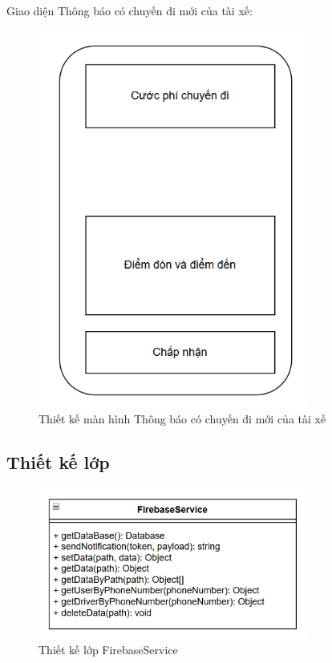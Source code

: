 \documentclass[../DoAn.tex]{subfiles}
\begin{document}
Giao diện Thông báo có chuyến đi mới của tài xế:
\begin{figure}[H]
    \centering
    \includegraphics[width=0.8\textwidth]{Hinhve/Man_hinh_thong_bao_chuyen_di_driver.png}
    \caption{Thiết kế màn hình Thông báo có chuyến đi mới của tài xế}
    \label{fig:Man_hinh_thong_bao_chuyen_di_driver}
\end{figure}

\subsection{Thiết kế lớp}

\begin{figure}[H]
    \centering
    \includegraphics[width=0.8\textwidth]{Hinhve/Lop_firebase_service.png}
    \caption{Thiết kế lớp FirebaseService}
    \label{fig:Lop_firebase_service}
\end{figure}
\end{document}

